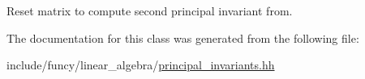 Reset matrix to compute second principal invariant from. 



The documentation for this class was generated from the following file\-:\begin{DoxyCompactItemize}
\item 
include/funcy/linear\-\_\-algebra/\hyperlink{principal__invariants_8hh}{principal\-\_\-invariants.\-hh}\end{DoxyCompactItemize}
